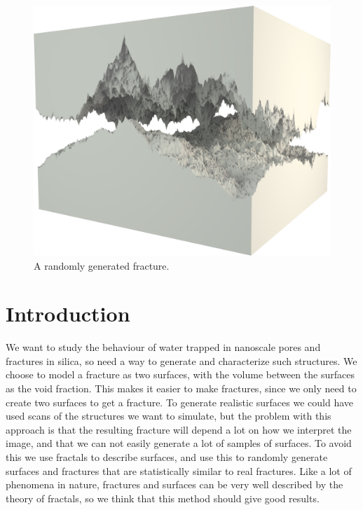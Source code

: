 \vspace*{\fill}
\begin{figure}[hp!]%
\thispagestyle{empty}
    \centering%
    \includegraphics[width=\textwidth]{images/fracture/large_fracture05.jpg}%
    \caption{%
        A randomly generated fracture.%
    }%
\end{figure}%
\vspace{\fill}

\chapter{Introduction}
We want to study the behaviour of water trapped in nanoscale pores and fractures in silica, so need a way to generate and characterize such structures. We choose to model a fracture as two surfaces, with the volume between the surfaces as the void fraction. This makes it easier to make fractures, since we only need to create two surfaces to get a fracture. To generate realistic surfaces we could have used scans of the structures we want to simulate, but the problem with this approach is that the resulting fracture will depend a lot on how we interpret the image, and that we can not easily generate a lot of samples of surfaces. To avoid this we use fractals to describe surfaces, and use this to randomly generate surfaces and fractures that are statistically similar to real fractures. Like a lot of phenomena in nature, fractures and surfaces can be very well described by the theory of fractals\cite{mandelbrot1983fractal}, so we think that this method should give good results.

